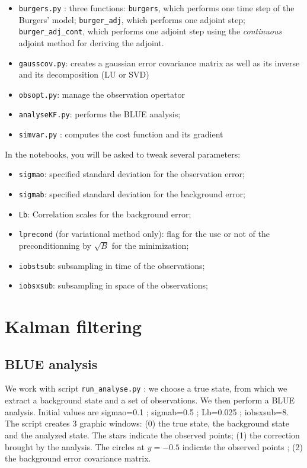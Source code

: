 \documentclass[11pt,a4paper]{article}
\begin{document}
 \begin{itemize}
 \item \texttt{burgers.py} : three functions: \texttt{burgers}, which performs one time step of the Burgers' model; \texttt{burger\_adj}, which performs one adjoint step; \texttt{burger\_adj\_cont}, which performs one adjoint step using the {\em continuous} adjoint method for deriving the adjoint.
 \item \texttt{gausscov.py}: creates a gaussian error covariance matrix as well as its inverse and its decomposition (LU or SVD)
 \item \texttt{obsopt.py}: manage the observation opertator
  \item \texttt{analyseKF.py}: performs the BLUE analysis;
 \item \texttt{simvar.py} : computes the cost function and its gradient
 \end{itemize}
%
In the notebooks, you will be asked to tweak several parameters:
\begin{itemize}
  \item \texttt{sigmao}: specified standard deviation for the observation error;
   \item \texttt{sigmab}: specified standard deviation for the background error;
   \item \texttt{Lb}: Correlation scales for the background error;
   \item \texttt{lprecond} (for variational method only): flag for the use or not of the preconditionning by $\sqrt{B}$ for the minimization;
   \item \texttt{iobstsub}: subsampling in time of the observations;
   \item \texttt{iobsxsub}: subsampling in space of the observations;
 \end{itemize}
%
\section{Kalman filtering}

\subsection{BLUE analysis}

We work with
script \texttt{run\_analyse.py} : we choose a true state, from which we extract a background state and a set of observations. We then perform a BLUE analysis.
Initial values are sigmao=0.1 ; sigmab=0.5 ; Lb=0.025 ; iobsxsub=8.
The script creates 3 graphic windows: (0) the true state, the background state and the analyzed state. The stars indicate the observed points; (1) the correction brought by the analysis. The circles at $y=-0.5$ indicate the observed points ; (2) the background error covariance matrix.  \\
\end{document}
